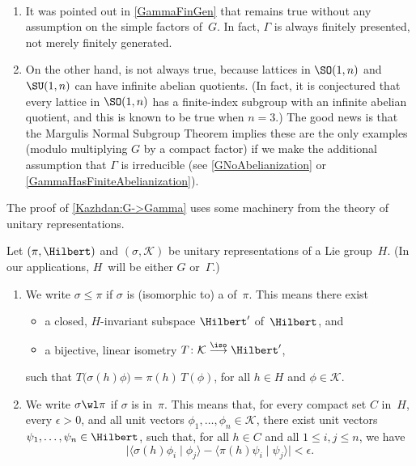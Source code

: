 \begin{rems} \label{KazhdanLattRem} \ 
\noprelistbreak
\begin{enumerate}
\item It was pointed out in \cref{GammaFinGen} that  remains true without any assumption on the simple factors of~$G$. In fact, $\Gamma$ is always finitely presented, not merely finitely generated.
\item \label{KazhdanLattRem-abel}
On the other hand,  is not always true, because lattices in $\SO(1,n)$ and $\SU(1,n)$ can have infinite abelian quotients. (In fact, it is conjectured that every lattice in $\SO(1,n)$ has a finite-index subgroup with an infinite abelian quotient, and this is known to be true when $n = 3$.) The good news is that the Margulis Normal Subgroup Theorem implies these are the only examples (modulo multiplying $G$ by a compact factor) if we make the additional assumption that $\Gamma$ is irreducible (see \cref{GNoAbelianization} or \cref{GammaHasFiniteAbelianization}).
\end{enumerate}
\end{rems}

The proof of \cref{Kazhdan:G->Gamma} uses some machinery from the theory of unitary representations.

\begin{notation}
 Let $(\pi, \Hilbert)$ and $(\sigma,\mathcal{K})$ be unitary representations of a Lie group~$H$. (In our applications, $H$~will be either $G$ or~$\Gamma$.)
 \begin{enumerate}
 
 \item We write 
	$\sigma \le \pi$ if $\sigma$ is (isomorphic to) a  of~$\pi$. 
This means there exist
	\begin{itemize}
	\item a closed, $H$-invariant subspace $\Hilbert'$ of~$\Hilbert$,
	and
	\item a bijective, linear isometry $T \colon \mathcal{K} \stackrel{\iso}{\longrightarrow} \Hilbert'$,
	\end{itemize}
such that $T \bigl( \sigma(h) \phi \bigr) = \pi(h) \, T(\phi)$, for all $h \in H$ and $\phi \in \mathcal{K}$.

 \item We write 
	$\sigma \wl \pi$ if $\sigma$ is \defit{weakly contained} in~$\pi$. This means that, for every compact set $C$ in~$H$, every $\epsilon > 0$,
 and all unit vectors $\phi _1, \ldots,\phi_n  \in \mathcal{K}$,
 there exist unit vectors
$\psi_1,\ldots,\psi_n \in \Hilbert$, such that, for all $h \in C$ and
all $1 \le i,j \le n$, we have
 $$  \bigl| \langle \sigma(h) \phi_i \mid \phi_j \rangle - \langle \pi(h) \psi_i 
\mid  \psi_j  \rangle \bigr| < \epsilon . $$
 \end{enumerate}
\end{notation}

